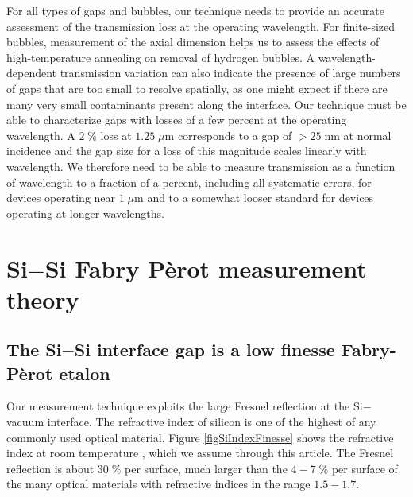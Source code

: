 \documentclass[osajnl,preprint,showpacs,superscriptaddress,12pt]{revtex4-1} %
\begin{document}
For all types of gaps and bubbles, our technique needs to provide an accurate assessment of the transmission loss at the operating wavelength.  For finite-sized bubbles, measurement of the axial dimension helps us to assess the effects of high-temperature annealing \cite{Horn2009, Masteika2014} on removal of hydrogen bubbles.  A wavelength-dependent transmission variation can also indicate the presence of large numbers of gaps that are too small to resolve spatially, as one might expect if there are many very small contaminants present along the interface.  Our technique must be able to characterize gaps with losses of a few percent at the operating wavelength.  A $2\;\%$ loss at $1.25\;\mu$m corresponds to a gap of $>25\;$nm at normal incidence and the gap size for a loss of this magnitude scales linearly with wavelength.  We therefore need to be able to measure transmission as a function of wavelength to a fraction of a percent, including all systematic errors, for devices operating near $1\;\mu$m and to a somewhat looser standard for devices operating at longer wavelengths.


\section{Si$-$Si Fabry P\`{e}rot measurement theory}
\label{secTheory}

\subsection{The Si$-$Si interface gap is a low finesse Fabry-P\`{e}rot etalon}

Our measurement technique exploits the large Fresnel reflection \cite{2001opt4.book.....H} at the Si$-$vacuum interface.  The refractive index of silicon is one of the highest of any commonly used optical material.  Figure \ref{figSiIndexFinesse} shows the refractive index at room temperature \cite{2006SPIE.6273E..77F}, which we assume through this article.  The Fresnel reflection is about $30\;\%$ per surface, much larger than the $4-7\;\%$ per surface of the many optical materials with refractive indices in the range $1.5-1.7$.
\end{document}

